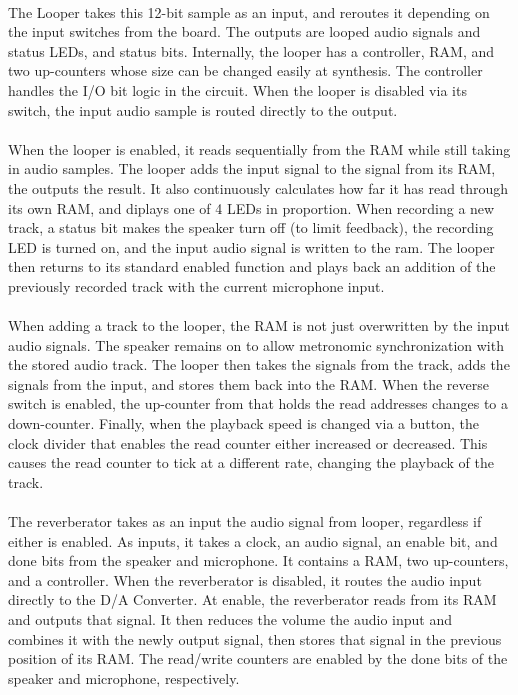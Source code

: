 \documentclass[12pt]{article}
\begin{document}
\paragraph{}
The Looper takes this 12-bit sample as an input, and reroutes it depending on the input switches from the board. The outputs are looped audio signals and status LEDs, and status bits. Internally, the looper has a controller, RAM, and two up-counters whose size can be changed easily at synthesis. The controller  handles the I/O bit logic in the circuit. When the looper is disabled via its switch, the input audio sample is routed directly to the output.
\paragraph{}
When the looper is enabled, it reads sequentially from the RAM while still taking in audio samples. The looper adds the input signal to the signal from its RAM, the outputs the result. It also continuously calculates how far it has read through its own RAM, and diplays one of 4 LEDs in proportion. When recording a new track, a status bit makes the speaker turn off (to limit feedback), the recording LED is turned on, and the input audio signal is written to the ram. The looper then returns to its standard enabled function and plays back an addition of the previously recorded track with the current microphone input.

\paragraph{}
When adding a track to the looper, the RAM is not just overwritten by the input audio signals. The speaker remains on to allow metronomic synchronization with the stored audio track. The looper then takes the signals from the track, adds the signals from the input, and stores them back into the RAM. When the reverse switch is enabled, the up-counter from that holds the read addresses changes to a down-counter. Finally, when the playback speed is changed via a button, the clock divider that enables the read counter either increased or decreased. This causes the read counter to tick at a different rate, changing the playback of the track. 

\paragraph{}
The reverberator takes as an input the audio signal from looper, regardless if either is enabled. As inputs, it takes a clock, an audio signal, an enable bit, and done bits from the speaker and microphone. It contains a RAM, two up-counters, and a controller. When the reverberator is disabled, it routes the audio input directly to the D/A Converter. At enable, the reverberator reads from its RAM and outputs that signal. It then reduces the volume the audio input and combines it with the newly output signal, then stores that signal in the previous position of its RAM. The read/write counters are enabled by the done bits of the speaker and microphone, respectively. 
\end{document}
